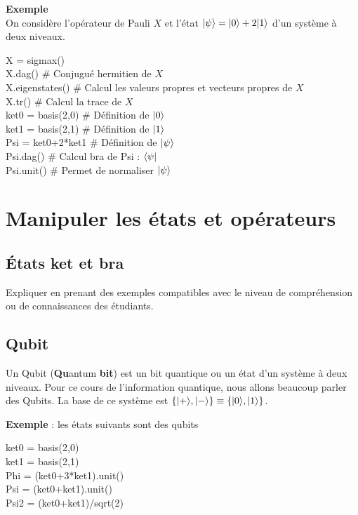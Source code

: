\textbf{Exemple}\\
On considère l'opérateur de Pauli $X$ et l'état $\vert\psi\rangle=\vert0\rangle+2\vert1\rangle$ d'un système à deux niveaux.\\
\begin{tt}
X = sigmax()\\
X.dag() \# Conjugué hermitien de $X$\\
X.eigenstates() \# Calcul les valeurs propres et vecteurs propres de $X$\\
X.tr() \# Calcul la trace de $X$\\
ket0 = basis(2,0) \# Définition de $\vert0\rangle$\\
ket1 = basis(2,1) \# Définition de $\vert1\rangle$\\
Psi = ket0+2*ket1 \# Définition de $\vert\psi\rangle$\\
Psi.dag() \# Calcul bra de Psi : $\langle\psi\vert$\\
Psi.unit() \# Permet de normaliser $\vert\psi\rangle$\\
\end{tt}
\section{Manipuler les états et opérateurs}

\subsection{États ket et bra}

Expliquer en prenant des exemples compatibles avec le niveau de compréhension
ou de connaissances des étudiants.

\subsection{Qubit}

Un Qubit (\textbf{Qu}antum \textbf{bit}) est un bit quantique ou un état d'un système à deux niveaux. Pour ce cours de l'information quantique, nous allons beaucoup parler des Qubits. La base de ce système est $\{\vert+\rangle,\vert-\rangle\}\equiv\{\vert0\rangle,\vert1\rangle\}$.

\textbf{Exemple} : les états suivants sont des qubits\\
\begin{tt}
ket0 = basis(2,0) \\
ket1 = basis(2,1)\\
Phi = (ket0+3*ket1).unit()\\
Psi = (ket0+ket1).unit()\\
Psi2 = (ket0+ket1)/sqrt(2)\\
\end{tt}

